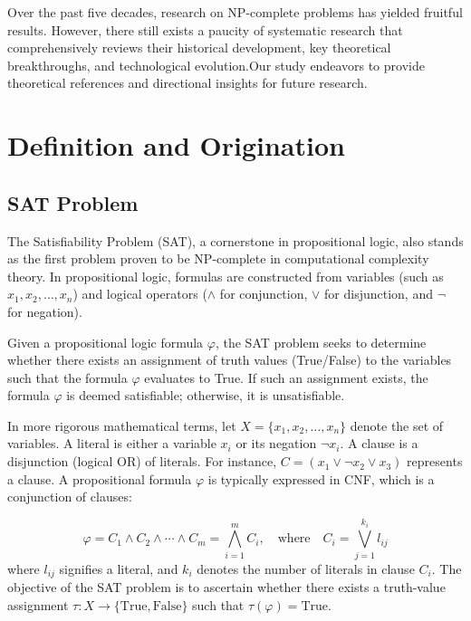 \documentclass[acmsmall]{acmart}
\begin{document}
	Over the past five decades, research on NP-complete problems has yielded fruitful results\cite{cormen2009introduction}. However, there still exists a paucity of systematic research that comprehensively reviews their historical development, key theoretical breakthroughs, and technological evolution.Our study endeavors to provide theoretical references and directional insights for future research. 
	\section{Definition and Origination}
	\subsection{SAT Problem}
	The Satisfiability Problem (SAT), a cornerstone in propositional logic, also stands as the first problem proven to be NP-complete in computational complexity theory. In propositional logic, formulas are constructed from variables (such as \(x_1, x_2, \ldots, x_n\)) and logical operators (\(\land\) for conjunction, \(\lor\) for disjunction, and \(\neg\) for negation).
	
	Given a propositional logic formula \(\varphi\), the SAT problem seeks to determine whether there exists an assignment of truth values (True/False) to the variables such that the formula \(\varphi\) evaluates to True. If such an assignment exists, the formula \(\varphi\) is deemed satisfiable; otherwise, it is unsatisfiable.
	
	In more rigorous mathematical terms, let \(X = \{x_1, x_2, \ldots, x_n\}\) denote the set of variables. A literal is either a variable \(x_i\) or its negation \(\neg x_i\). A clause is a disjunction (logical OR) of literals. For instance, \(C=(x_1\lor\neg x_2\lor x_3)\) represents a clause. A propositional formula \(\varphi\) is typically expressed in CNF, which is a conjunction of clauses:
	
	\begin{equation}
	\varphi = C_1\land C_2\land\cdots\land C_m=\bigwedge_{i = 1}^{m}C_i,\quad\text{where}\quad C_i=\bigvee_{j = 1}^{k_i}l_{ij}
	\end{equation}
	where \(l_{ij}\) signifies a literal, and \(k_i\) denotes the number of literals in clause \(C_i\). The objective of the SAT problem is to ascertain whether there exists a truth-value assignment \(\tau:X\rightarrow\{\text{True},\text{False}\}\) such that \(\tau(\varphi)=\text{True}\).
	
\end{document}
